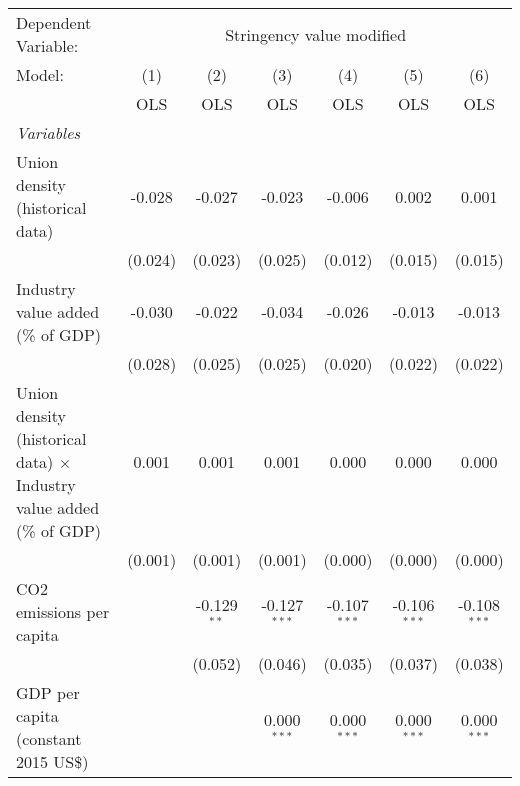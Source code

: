 
\begingroup
\centering
\begin{tabular}{lcccccc}
   \toprule
   Dependent Variable: & \multicolumn{6}{c}{Stringency value modified}\\
   Model:                                                                      & (1)     & (2)           & (3)            & (4)            & (5)            & (6)\\  
                                                                               &  OLS    & OLS           & OLS            & OLS            & OLS            & OLS\\  
   \midrule
   \emph{Variables}\\
   Union density (historical data)                                             & -0.028  & -0.027        & -0.023         & -0.006         & 0.002          & 0.001\\   
                                                                               & (0.024) & (0.023)       & (0.025)        & (0.012)        & (0.015)        & (0.015)\\   
   Industry value added (\% of GDP)                                            & -0.030  & -0.022        & -0.034         & -0.026         & -0.013         & -0.013\\   
                                                                               & (0.028) & (0.025)       & (0.025)        & (0.020)        & (0.022)        & (0.022)\\   
   Union density (historical data) $\times$ Industry value added (\% of GDP)   & 0.001   & 0.001         & 0.001          & 0.000          & 0.000          & 0.000\\   
                                                                               & (0.001) & (0.001)       & (0.001)        & (0.000)        & (0.000)        & (0.000)\\   
   CO2 emissions per capita                                                    &         & -0.129$^{**}$ & -0.127$^{***}$ & -0.107$^{***}$ & -0.106$^{***}$ & -0.108$^{***}$\\   
                                                                               &         & (0.052)       & (0.046)        & (0.035)        & (0.037)        & (0.038)\\   
   GDP per capita (constant 2015 US\$)                                         &         &               & 0.000$^{***}$  & 0.000$^{***}$  & 0.000$^{***}$  & 0.000$^{***}$\\   

\end{tabular}
